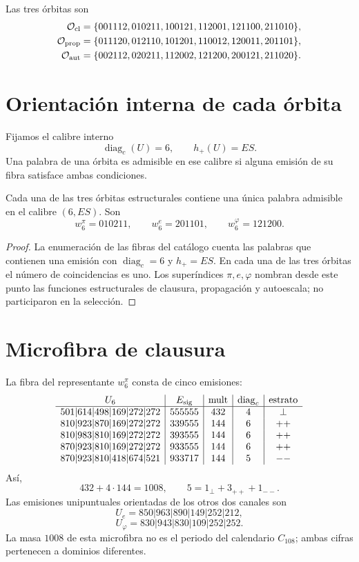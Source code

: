 Las tres órbitas son
\begin{align*}
\mathcal O_{\rm cl}
 &=\{001112,010211,100121,112001,121100,211010\},\\
\mathcal O_{\rm prop}
 &=\{011120,012110,101201,110012,120011,201101\},\\
\mathcal O_{\rm aut}
 &=\{002112,020211,112002,121200,200121,211020\}.
\end{align*}

\section{Orientación interna de cada órbita}

Fijamos el calibre interno
\[
 \operatorname{diag}_c(U)=6,
 \qquad h_+(U)=ES.
\]
Una palabra de una órbita es admisible en ese calibre si alguna emisión de
su fibra satisface ambas condiciones.

\begin{proposition}
\label{prop:representante-orientado-unico}
Cada una de las tres órbitas estructurales contiene una única palabra
admisible en el calibre \((6,ES)\). Son
\[
 \boxed{
 w_6^\pi=010211,
 \qquad
 w_6^e=201101,
 \qquad
 w_6^\varphi=121200.}
\]
\end{proposition}

\begin{proof}
La enumeración de las fibras del catálogo cuenta las palabras que contienen
una emisión con \(\operatorname{diag}_c=6\) y \(h_+=ES\). En cada una de
las tres órbitas el número de coincidencias es uno. Los superíndices
\(\pi,e,\varphi\) nombran desde este punto las funciones estructurales de
clausura, propagación y autoescala; no participaron en la selección.
\end{proof}

\section{Microfibra de clausura}

La fibra del representante \(w_6^\pi\) consta de cinco emisiones:
\[
\begin{array}{c|c|c|c|c}
U_6&E_{\rm sig}&\operatorname{mult}&\operatorname{diag}_c&\text{estrato}\\\hline
501|614|498|169|272|272&555555&432&4&\perp\\
810|923|870|169|272|272&339555&144&6&++\\
810|983|810|169|272|272&393555&144&6&++\\
870|923|810|169|272|272&933555&144&6&++\\
870|923|810|418|674|521&933717&144&5&--
\end{array}
\]
Así,
\[
 432+4\cdot144=1008,
 \qquad
 5=1_\perp+3_{++}+1_{--}.
\]
Las emisiones unipuntuales orientadas de los otros dos canales son
\[
 U_e=850|963|890|149|252|212,
\]
\[
 U_\varphi=830|943|830|109|252|252.
\]
La masa \(1008\) de esta microfibra no es el periodo del calendario
\(C_{108}\); ambas cifras pertenecen a dominios diferentes.

